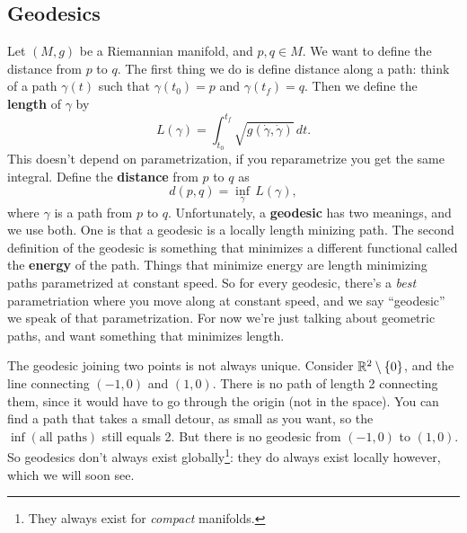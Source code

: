 \subsection{Geodesics}
Let $(M,g)$ be a Riemannian manifold, and $p, q \in M$. We want to define the distance from $p$ to $q$. The first thing we do is define distance along a path: think of a path $\gamma (t)$ such that $\gamma (t_0)=p$ and $\gamma (t_f)=q$. Then we define the \textbf{length} of $\gamma $ by \[
    L(\gamma )=\int_{t_0}^{t_f} \sqrt{g(\dot \gamma ,\dot \gamma )}  \, dt.
\] This doesn't depend on parametrization, if you reparametrize you get the same integral. Define the \textbf{distance} from $p$ to $q$ as 
\[
d(p,q)=\underset{\gamma }{\inf} \,L(\gamma ),
\] 
where $\gamma $ is a path from $p$ to $q$. Unfortunately, a \textbf{geodesic} has two meanings, and we use both. One is that a geodesic is a locally length minizing path. The second definition of the geodesic is something that minimizes a different functional called the \textbf{energy} of the path. Things that minimize energy are length minimizing paths parametrized at constant speed. So for every geodesic, there's a \emph{best} parametriation where you move along at constant speed, and we say ``geodesic'' we speak of that parametrization. For now we're just talking about geometric paths, and want something that minimizes length.

The geodesic joining two points is not always unique. Consider $\mathbb{R}^2 \setminus \{0\} $, and the line connecting $(-1,0)$ and $(1,0)$. There is no path of length 2 connecting them, since it would have to go through the origin (not in the space). You can find a path that takes a small detour, as small as you want, so the $\operatorname{inf}(\text{all paths} )$ still equals 2. But there is no geodesic from $(-1,0)$ to $(1,0)$. So geodesics don't always exist globally\footnote{They always exist for \emph{compact} manifolds.}: they do always exist locally however, which we will soon see.

